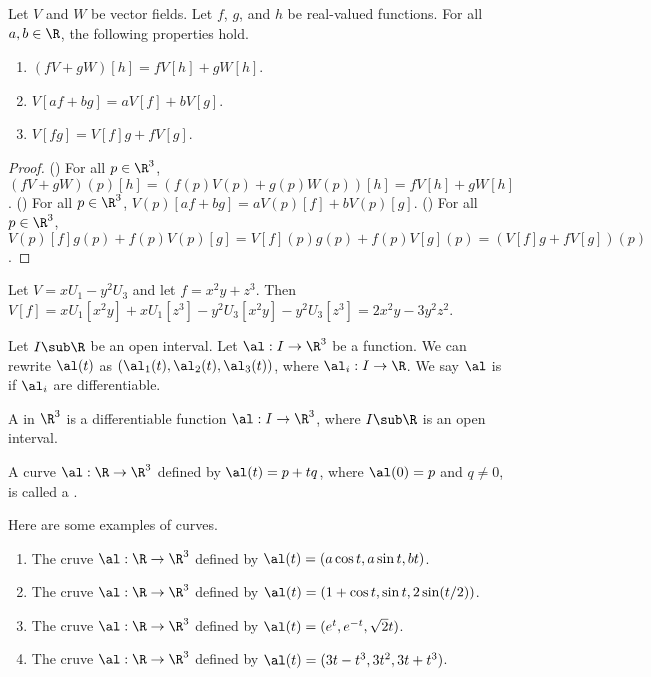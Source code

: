 \documentclass[10pt]{article}
\begin{document}
\begin{proposition}
    Let $V$ and $W$ be vector fields. Let $f$, $g$, and $h$ be real-valued functions. For all $a,b\in\R$, the following properties hold.
    \begin{enumerate}
        \item $(fV+gW)[h]=fV[h]+gW[h]$.
        \item $V[af+bg]=aV[f]+bV[g]$.
        \item $V[fg]=V[f]g+fV[g]$.
    \end{enumerate}
\end{proposition}
\begin{proof}
    () For all $p\in{\R}^{3}$, $(fV+gW)(p)[h]=(f(p)V(p)+g(p)W(p))[h]=fV[h]+gW[h]$. () For all $p\in{\R}^{3}$, $V(p)[af+bg]=aV(p)[f]+bV(p)[g]$. () For all $p\in{\R}^{3}$, $V(p)[f]g(p)+f(p)V(p)[g]=V[f](p)g(p)+f(p)V[g](p)=(V[f]g+fV[g])(p)$.
\end{proof}
\begin{example}
    Let $V=x{U}_{1}-{y}^{2}{U}_{3}$ and let $f={x}^{2}y+{z}^{3}$. Then $V[f]=x{U}_{1}[{x}^{2}y]+x{U}_{1}[{z}^{3}]-{y}^{2}{U}_{3}[{x}^{2}y]-{y}^{2}{U}_{3}[{z}^{3}]=2{x}^{2}y-3{y}^{2}{z}^{2}$.
\end{example}
\par
Let $I\sub\R$ be an open interval. Let $\al:I\to{\R}^{3}$ be a function. We can rewrite $\al(t)$ as $({\al}_{1}(t),{\al}_{2}(t),{\al}_{3}(t))$, where ${\al}_{i}:I\to\R$. We say $\al$ is  if ${\al}_{i}$ are differentiable.
\begin{definition}
    A  in ${\R}^{3}$ is a differentiable function $\al:I\to{\R}^{3}$, where $I\sub\R$ is an open interval.
\end{definition}
\begin{example}
    A curve $\al:\R\to{\R}^{3}$ defined by $\al(t)=p+tq$, where $\al(0)=p$ and $q\ne 0$, is called a .
\end{example}
\begin{example}
    Here are some examples of curves.
    \begin{enumerate}
        \item The cruve $\al:\R\to{\R}^{3}$ defined by $\al(t)=(a\cos t,a\sin t,bt)$.
        \item The cruve $\al:\R\to{\R}^{3}$ defined by $\al(t)=(1+\cos t,\sin t,2\sin(t/2))$.
        \item The cruve $\al:\R\to{\R}^{3}$ defined by $\al(t)=({e}^{t},{e}^{-t},\sqrt{2}t)$.
        \item The cruve $\al:\R\to{\R}^{3}$ defined by $\al(t)=(3t-{t}^{3},3{t}^{2},3t+{t}^{3})$.
    \end{enumerate}
\end{example}
\end{document}
